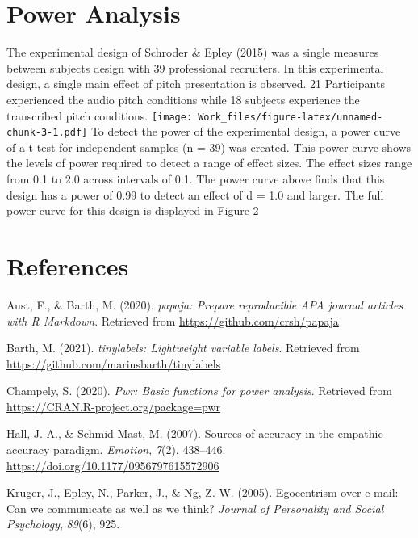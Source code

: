 \documentclass[
  english,
  man,floatsintext]{apa6}
\begin{document}
\hypertarget{power-analysis}{%
\section{Power Analysis}\label{power-analysis}}

The experimental design of Schroder \& Epley (2015) was a single measures between subjects design with 39 professional recruiters. In this experimental design, a single main effect of pitch presentation is observed. 21 Participants experienced the audio pitch conditions while 18 subjects experience the transcribed pitch conditions.
\texttt{[image: Work\_files/figure-latex/unnamed-chunk-3-1.pdf]}
To detect the power of the experimental design, a power curve of a t-test for independent samples (n = 39) was created. This power curve shows the levels of power required to detect a range of effect sizes. The effect sizes range from 0.1 to 2.0 across intervals of 0.1. The power curve above finds that this design has a power of 0.99 to detect an effect of d = 1.0 and larger. The full power curve for this design is displayed in Figure 2

\newpage

\hypertarget{references}{%
\section{References}\label{references}}

\begingroup
\setlength{\parindent}{-0.5in}
\setlength{\leftskip}{0.5in}

\hypertarget{refs}{}
\leavevmode\hypertarget{ref-R-papaja}{}%
Aust, F., \& Barth, M. (2020). \emph{papaja: Prepare reproducible APA journal articles with R Markdown}. Retrieved from \url{https://github.com/crsh/papaja}

\leavevmode\hypertarget{ref-R-tinylabels}{}%
Barth, M. (2021). \emph{tinylabels: Lightweight variable labels}. Retrieved from \url{https://github.com/mariusbarth/tinylabels}

\leavevmode\hypertarget{ref-R-pwr}{}%
Champely, S. (2020). \emph{Pwr: Basic functions for power analysis}. Retrieved from \url{https://CRAN.R-project.org/package=pwr}

\leavevmode\hypertarget{ref-Hall_2007}{}%
Hall, J. A., \& Schmid Mast, M. (2007). Sources of accuracy in the empathic accuracy paradigm. \emph{Emotion}, \emph{7}(2), 438--446. \url{https://doi.org/10.1177/0956797615572906}

\leavevmode\hypertarget{ref-kruger2005egocentrism}{}%
Kruger, J., Epley, N., Parker, J., \& Ng, Z.-W. (2005). Egocentrism over e-mail: Can we communicate as well as we think? \emph{Journal of Personality and Social Psychology}, \emph{89}(6), 925.
\end{document}
